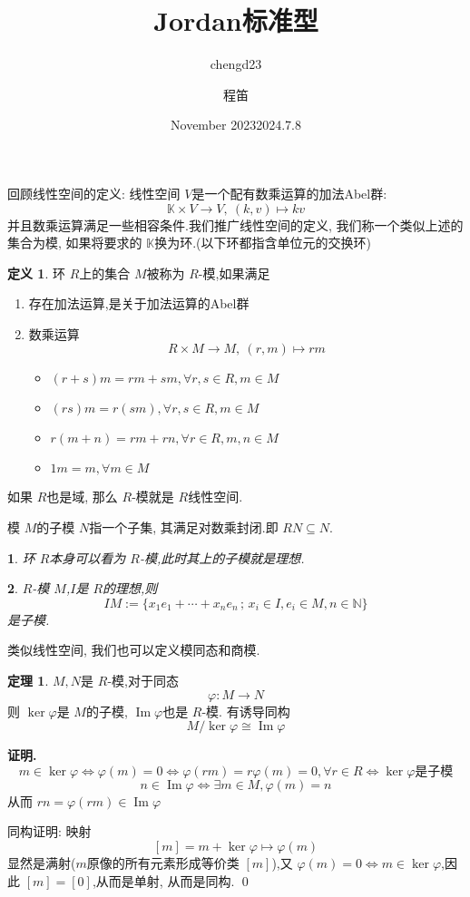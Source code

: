 \documentclass[12pt, a4paper,oneside, UTF8]{ctexart}
\author{chengd23 }
\date{November 2023}
\title{\textbf{Jordan标准型}}
\author{程笛}
\date{2024.7.8}
\theoremstyle{definition}
\newtheorem{defn}{\indent 定义}
\newtheorem{thm}[lemma]{\indent 定理}
\theoremstyle{plain}
\newtheorem{example}{\indent {例}} %
\renewenvironment{proof}{\par\textbf{证明.}\;}{\qed\par} %
\begin{document}
\maketitle
回顾线性空间的定义:
线性空间 $V$是一个配有数乘运算的加法Abel群:
\[
\mathbb{K} \times V \to V, \ (k,v) \mapsto kv
\] 
并且数乘运算满足一些相容条件.我们推广线性空间的定义, 我们称一个类似上述的集合为模, 如果将要求的 $\mathbb{K}$换为环.(以下环都指含单位元的交换环)

\begin{defn}
    环 $R$上的集合 $M$被称为 $R$-模,如果满足
    \begin{enumerate}
        \item 存在加法运算,是关于加法运算的Abel群
        \item 数乘运算
        \[
        R \times M \to M, \ (r,m) \mapsto rm
        \]
    \begin{itemize}
        \item $(r+s)m = rm+sm, \forall r,s \in R, m \in M$
        \item $(rs)m = r(sm), \forall r,s \in R, m \in M$
        \item $r(m+n)= rm+rn,\forall r \in R, m,n \in M$
        \item $1m = m, \forall m \in M$
    \end{itemize}
    \end{enumerate}
\end{defn}

如果 $R$也是域, 那么 $R$-模就是 $R$线性空间.


模 $M$的子模 $N$指一个子集, 其满足对数乘封闭.即 $RN \subseteq N$.

\begin{example}
    环 $R$本身可以看为 $R$-模,此时其上的子模就是理想.
\end{example}
    \begin{example}
    $R$-模 $M$,$I$是 $R$的理想,则
    \[
    IM :=\{ x_1e_1+ \cdots +x_ne_{n}\, ;\, x_{i}\in I, e_{i}\in M ,n\in \mathbb{N}\}
    \]
    是子模.
\end{example}


类似线性空间, 我们也可以定义模同态和商模.


\begin{thm}
    $M,N$是 $R$-模,对于同态
    \[
    \varphi:M \to N
    \]
    则 $\operatorname{ker}\varphi$是 $M$的子模, $\operatorname{Im}\varphi$也是 $R$-模.
    有诱导同构
    \[
    M / \operatorname{ker}\varphi \cong \operatorname{Im}\varphi
    \]
\end{thm}
\begin{proof}
    $$m \in \operatorname{ker}\varphi \iff \varphi(m)= 0 \iff \varphi(rm) = r\varphi(m) = 0, \forall r \in R \iff \operatorname{ker}\varphi\text{是子模}$$
    $$n \in \operatorname{Im}\varphi \iff \exists m \in M, \varphi(m) = n $$从而 $rn = \varphi(rm)\in \operatorname{Im}\varphi$

    同构证明: 映射
    \[
    [m] = m+\operatorname{ker}\varphi \mapsto \varphi(m)
    \]显然是满射($m$原像的所有元素形成等价类 $[m]$),又 $\varphi(m) = 0 \iff m \in \operatorname{ker}\varphi$,因此 $[m] = [0]$,从而是单射, 从而是同构.
\end{proof}
\end{document}
